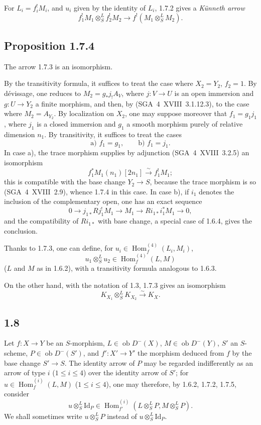 \documentclass[11pt]{article}
\DeclareMathOperator{\Hom}{Hom}
\newcommand{\ob}{\operatorname{ob}}
\providecommand{\Id}{\mathrm{Id}}
\providecommand{\Hom}{\operatorname{Hom}}
\providecommand{\ob}{\operatorname{ob}}
\providecommand{\Hom}{\operatorname{Hom}}
\begin{document}
For $L_i=f_i^{!}M_i$, and $u_i$ given by the identity of $L_i$, 1.7.2 gives a \emph{Künneth arrow}
\begin{equation}\tag{1.7.3}
f_1^{!}M_1\otimes^L_Sf_2^{!}M_2\longrightarrow f^{!}(M_1\otimes^L_SM_2).
\end{equation}

\subsection*{Proposition 1.7.4}
The arrow 1.7.3 is an isomorphism.

By the transitivity formula, it suffices to treat the case where $X_2=Y_2$, $f_2=1$. By dévissage, one reduces to $M_2=g_{*}j_{!}A_V$, where $j:V\to U$ is an open immersion and $g:U\to Y_2$ a finite morphism, and then, by (SGA~4~XVIII~3.1.12.3), to the case where $M_2=A_{Y_2}$. By localization on $X_2$, one may suppose moreover that $f_1=g_1j_1$, where $j_1$ is a closed immersion and $g_1$ a smooth morphism purely of relative dimension $n_1$. By transitivity, it suffices to treat the cases
\[
\text{a) } f_1=g_1,\qquad \text{b) } f_1=j_1.
\]
In case a), the trace morphism supplies by adjunction (SGA~4~XVIII~3.2.5) an isomorphism
\[
f_1^{*}M_1(n_1)[2n_1]\xrightarrow{\sim}f_1^{!}M_1;
\]
this is compatible with the base change $Y_2\to S$, because the trace morphism is so (SGA~4~XVIII~2.9), whence 1.7.4 in this case. In case b), if $i_1$ denotes the inclusion of the complementary open, one has an exact sequence
\[
0\longrightarrow j_{1*}Rj_1^{!}M_1\longrightarrow M_1\longrightarrow Ri_{1*}i_1^{*}M_1\longrightarrow0,
\]
and the compatibility of $Ri_{1*}$ with base change, a special case of 1.6.4, gives the conclusion.

Thanks to 1.7.3, one can define, for $u_i\in\Hom_{f}^{(4)}(L_i,M_i)$,
\begin{equation}\tag{1.7.5}
u_1\otimes^L_Su_2\in\Hom_f^{(4)}(L,M)
\end{equation}
($L$ and $M$ as in 1.6.2), with a transitivity formula analogous to 1.6.3.

On the other hand, with the notation of 1.3, 1.7.3 gives an isomorphism
\begin{equation}\tag{1.7.6}
K_{X_1}\otimes^L_SK_{X_2}\xrightarrow{\sim}K_X.
\end{equation}

\subsection*{1.8}
Let $f:X\to Y$ be an $S$-morphism, $L\in\ob D^{-}(X)$, $M\in\ob D^{-}(Y)$, $S'$ an $S$-scheme, $P\in\ob D^{-}(S')$, and $f':X'\to Y'$ the morphism deduced from $f$ by the base change $S'\to S$. The identity arrow of $P$ may be regarded indifferently as an arrow of type $i$ ($1\leq i\leq4$) over the identity arrow of $S'$; for $u\in\Hom_f^{(i)}(L,M)$ ($1\leq i\leq4$), one may therefore, by 1.6.2, 1.7.2, 1.7.5, consider
\begin{equation}\tag{1.8.1}
u\otimes^L_S\Id_P\in\Hom_{f'}^{(i)}(L\otimes^L_SP,M\otimes^L_SP).
\end{equation}
We shall sometimes write $u\otimes^L_SP$ instead of $u\otimes^L_S\Id_P$.
\end{document}
